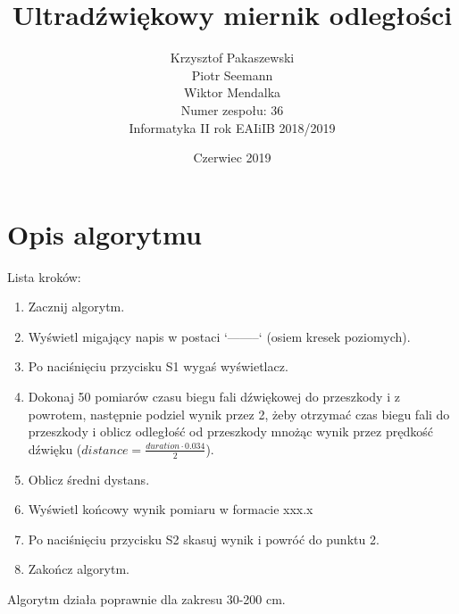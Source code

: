 \documentclass{article}
\title{Ultradźwiękowy miernik odległości}
\author{Krzysztof Pakaszewski\\Piotr Seemann\\Wiktor Mendalka\\Numer zespołu: 36\\Informatyka II rok EAIiIB 2018/2019}
\date{Czerwiec 2019}
\begin{document}
\maketitle

\section{Opis algorytmu}

Lista kroków:
 \begin{enumerate}
    \item Zacznij algorytm.
    \item Wyświetl migający napis w postaci ‘--------‘ (osiem kresek poziomych).
    \item Po naciśnięciu przycisku S1 wygaś wyświetlacz.
    \item Dokonaj 50 pomiarów czasu biegu fali dźwiękowej do przeszkody i z powrotem, następnie podziel wynik przez 2, żeby otrzymać czas biegu fali do przeszkody i oblicz odległość od przeszkody mnożąc wynik przez prędkość dźwięku ($distance = \frac{duration \cdot 0.034}{2}$).
    \item Oblicz średni dystans.
    \item Wyświetl końcowy wynik pomiaru w formacie xxx.x
    \item Po naciśnięciu przycisku S2 skasuj wynik i powróć do punktu 2.
    \item Zakończ algorytm.
\end{enumerate}

Algorytm działa poprawnie dla zakresu  30-200 cm.
\end{document}

